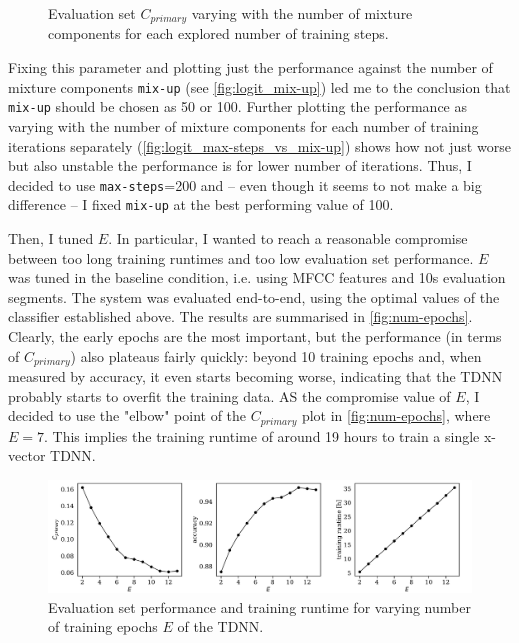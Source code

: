 \documentclass[bsc,frontabs,twoside,singlespacing,parskip,deptreport]{infthesis}
\begin{document}
{{\begin{figure}[h!]
      \caption{Evaluation set $C_{primary}$ varying with the number of mixture components for each explored number of training steps.}
      \label{fig:logit_max-steps_vs_mix-up}
    \end{figure}
    Fixing this parameter and plotting just the performance against the number of mixture components \verb|mix-up| (see \autoref{fig:logit_mix-up}) led me to the conclusion that \verb|mix-up| should be chosen as 50 or 100. Further plotting the performance as varying with the number of mixture components for each number of training iterations separately (\autoref{fig:logit_max-steps_vs_mix-up}) shows how not just worse but also unstable the performance is for lower number of iterations. Thus, I decided to use \verb|max-steps|=200 and -- even though it seems to not make a big difference -- I fixed \verb|mix-up| at the best performing value of 100.

    Then, I tuned $E$. In particular, I wanted to reach a reasonable compromise between too long training runtimes and too low evaluation set performance. $E$ was tuned in the baseline condition, i.e. using MFCC features and 10s evaluation segments. The system was evaluated end-to-end, using the optimal values of the classifier established above. The results are summarised in \autoref{fig:num-epochs}. Clearly, the early epochs are the most important, but the performance (in terms of $C_{primary}$) also plateaus fairly quickly: beyond 10 training epochs and, when measured by accuracy, it even starts becoming worse, indicating that the TDNN probably starts to overfit the training data. AS the compromise value of $E$, I decided to use the "elbow" point of the $C_{primary}$ plot in \autoref{fig:num-epochs}, where $E=7$. This implies the training runtime of around 19 hours to train a single x-vector TDNN.
    \begin{figure}[h!]
      \centering
      \includegraphics[width=14.9cm]{../img/num-epochs.pdf}
      \vspace*{-1em}
      \caption{Evaluation set performance and training runtime for varying number of training epochs $E$ of the TDNN.}
      \label{fig:num-epochs}
    \end{figure}
  }
}
\end{document}
